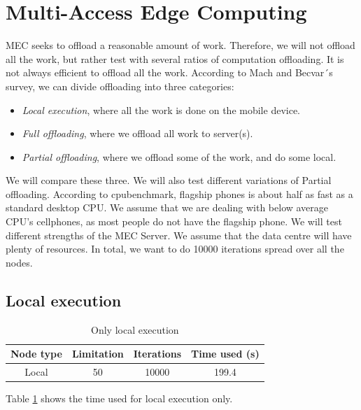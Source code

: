 \section{Multi-Access Edge Computing}
MEC seeks to offload a reasonable amount of work. Therefore, we will not offload all the work, but rather test with several ratios of computation offloading. It is not always efficient to offload all the work. According to Mach and Becvar´s survey\cite{mach_mobile_2017}, we can divide offloading into three categories:
\begin{itemize}
    \item \textit{Local execution}, where all the work is done on the mobile device.
    \item \textit{Full offloading}, where we offload all work to server(s).
    \item \textit{Partial offloading}, where we offload some of the work, and do some local.
\end{itemize}
We will compare these three. We will also test different variations of Partial offloading. According to cpubenchmark\cite{noauthor_passmark_nodate}, flagship phones is about half as fast as a standard desktop CPU. We assume that we are dealing with below average CPU's cellphones, as most people do not have the flagship phone. We will test different strengths of the MEC Server. We assume that the data centre will have plenty of resources. In total, we want to do 10000 iterations spread over all the nodes.

\subsection{Local execution}
\begin{table}[h!]
    \centering
    \begin{tabular}[c]{|c|c|c|c|}
        \hline
        Node type & Limitation & Iterations & Time used (s) \\
        \hline
        \hline
        Local & 50 & 10000 & 199.4 \\
        \hline
    \end{tabular}
    \caption{Only local execution}
    \label{tab:MEC_local_execution}
\end{table}
Table \ref{tab:MEC_local_execution} shows the time used for local execution only.



